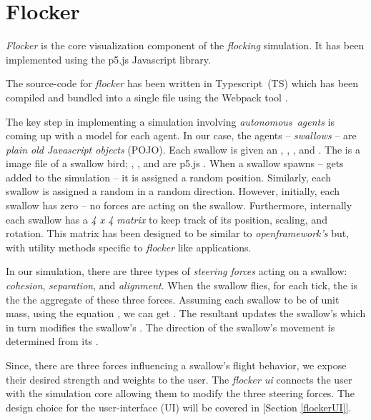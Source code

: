 \documentclass[../main]{subfiles}
\begin{document}
\section{Flocker}
\label{flocker}

{\em Flocker} \cite{flockerApp} is the core visualization component of the {\em flocking} simulation. It has been implemented using the p5.js\cite{p5js} Javascript library.

The source-code \cite{flockerSrc} for {\em flocker} has been written in \mbox{Typescript}~(TS) \cite{ts} which has been compiled and bundled into a single  file using the \mbox{Webpack} tool \cite{wbpack}.

The key step in implementing a simulation involving \mbox{\em autonomous~agents} is coming up with a model for each agent. In our case, the agents -- {\em swallows} -- are {\em plain old Javascript objects} (POJO). Each swallow is given an , , , and . The  is a  image file of a swallow bird; , , and  are p5.js . When a swallow spawns -- gets added to the simulation -- it is \mbox{assigned} a random position. Similarly, each swallow is assigned a random  in a random direction. However, initially, each swallow has zero  -- no forces are acting on the swallow. Furthermore, internally each swallow has a {\em 4 x 4 matrix} to keep track of its position, scaling, and rotation. This matrix has been designed to be similar to {\em openframework's}  but, with utility methods specific to {\em flocker} like applications.

In our simulation, there are three types of {\em steering forces} acting on a swallow: {\em cohesion}, {\em separation}, and {\em alignment}. When the swallow flies, for each tick, the  is the the aggregate of these three forces. Assuming each swallow to be of unit mass, using the equation , we can get . The resultant  updates the swallow's  which in turn modifies the swallow's . The direction of the swallow's movement is determined from its .

Since, there are three forces influencing a swallow's flight behavior, we expose their desired strength and weights to the user. The {\em flocker ui} connects the user with the simulation core allowing them to modify the three steering forces. The design choice for the user-interface (UI) will be covered in [Section \ref{flockerUI}].
\end{document}

